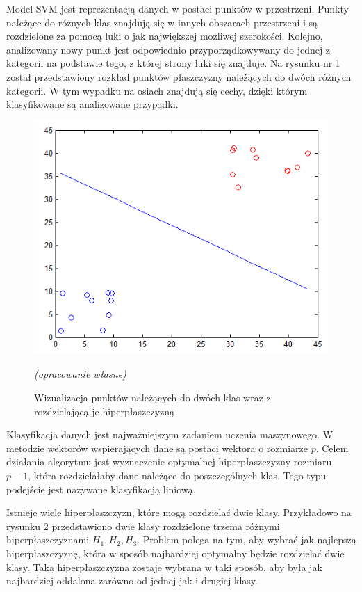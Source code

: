\documentclass[[10pt,a4paper]{article}
\begin{document}
Model SVM jest reprezentacją danych w postaci punktów w przestrzeni. Punkty należące do różnych klas znajdują się w innych obszarach przestrzeni i są rozdzielone za pomocą luki o jak największej możliwej szerokości. Kolejno, analizowany nowy punkt jest odpowiednio przyporządkowywany do jednej z kategorii na podstawie tego, z której strony luki się znajduje. Na rysunku nr 1 został przedstawiony rozkład punktów płaszczyzny należących do dwóch różnych kategorii. W tym wypadku na osiach znajdują się cechy, dzięki którym klasyfikowane są analizowane przypadki.
\vspace{5mm}
\begin{figure}[h]
\centering
\includegraphics{svm_theory}\\
\caption{Wizualizacja punktów należących do dwóch klas wraz z rozdzielającą je hiperpłaszczyzną} 
\textit{(opracowanie własne)}
\end{figure}

\vspace{10mm}
Klasyfikacja danych jest najważniejszym zadaniem uczenia maszynowego. W metodzie wektorów wspierających dane są postaci wektora o rozmiarze $p$. Celem działania algorytmu jest wyznaczenie optymalnej hiperpłaszczyzny rozmiaru $p-1$, która rozdzielałaby dane należące do poszczególnych klas.
Tego typu podejście jest nazywane klasyfikacją liniową. 
\vspace{5mm}


\indent Istnieje wiele hiperpłaszczyzn, które mogą rozdzielać dwie klasy. Przykładowo na rysunku 2 przedstawiono dwie klasy rozdzielone trzema różnymi hiperpłaszczyznami $H_1, H_2, H_3$. Problem polega na tym, aby wybrać jak najlepszą hiperpłaszczyznę, która w sposób najbardziej optymalny będzie rozdzielać dwie klasy. Taka hiperpłaszczyzna zostaje wybrana w taki sposób, aby była jak najbardziej oddalona zarówno od jednej jak i drugiej klasy. 
\end{document}
